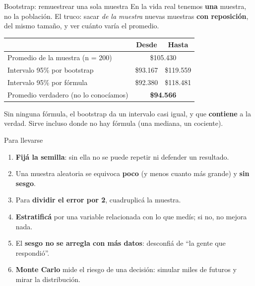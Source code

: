 \documentclass[aspectratio=169,10pt]{beamer}
\begin{document}
\begin{frame}{Bootstrap: remuestrear una sola muestra}
En la vida real tenemos \textbf{una} muestra, no la población. El truco: sacar \emph{de la muestra} nuevas muestras \textbf{con reposición}, del mismo tamaño, y ver cuánto varía el promedio.

\vspace{0.2cm}
\begin{center}
\small
\begin{tabular}{lcc}
\toprule
 & \textbf{Desde} & \textbf{Hasta} \\
\midrule
Promedio de la muestra (n = 200) & \multicolumn{2}{c}{\$105.430} \\
Intervalo 95\% por bootstrap & \$93.167 & \$119.559 \\
Intervalo 95\% por fórmula & \$92.380 & \$118.481 \\
\midrule
Promedio verdadero (no lo conocíamos) & \multicolumn{2}{c}{\textbf{\$94.566}} \\
\bottomrule
\end{tabular}
\end{center}
Sin ninguna fórmula, el bootstrap da un intervalo casi igual, y que \textbf{contiene} a la verdad. Sirve incluso donde no hay fórmula (una mediana, un cociente).
\end{frame}

\begin{frame}{Para llevarse}
\begin{enumerate}
  \item \textbf{Fijá la semilla}: sin ella no se puede repetir ni defender un resultado.
  \item Una muestra aleatoria se equivoca \textbf{poco} (y menos cuanto más grande) y \textbf{sin sesgo}.
  \item Para \textbf{dividir el error por 2}, cuadruplicá la muestra.
  \item \textbf{Estratificá} por una variable relacionada con lo que medís; si no, no mejora nada.
  \item El \textbf{sesgo no se arregla con más datos}: desconfiá de ``la gente que respondió''.
  \item \textbf{Monte Carlo} mide el riesgo de una decisión: simular miles de futuros y mirar la distribución.
\end{enumerate}
\end{frame}
\end{document}

